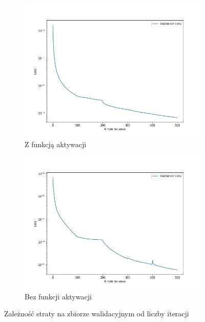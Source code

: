 \documentclass[12pt,a4paper]{article}
\begin{document}
\begin{figure}[h]
  \centering
\begin{subfigure}{0.5\textwidth}
  \includegraphics[width=\linewidth]{charts/activ_vs_noactiv/activ.png}
  \caption{Z funkcją aktywacji}
  \label{}
\end{subfigure}\hfil
\begin{subfigure}{0.5\textwidth}
  \includegraphics[width=\linewidth]{charts/activ_vs_noactiv/noactiv.png}
  \caption{Bez funkcji aktywacji}
  \label{}
\end{subfigure}
\caption{Zależność straty na zbiorze walidacyjnym od liczby iteracji}
\label{}
\end{figure}
\end{document}
